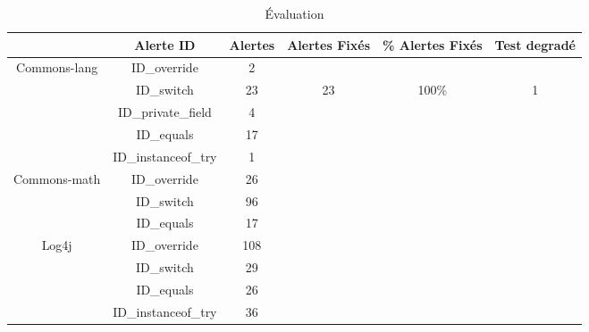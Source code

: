 \documentclass[a4paper]{article}
\begin{document}
\newpage
\begin{center}
	
	\begin{table}[]
\centering
\caption{Évaluation}
\label{my-label}
\begin{tabular}{c|c|c|c|c|c|}
\cline{2-6}
                                                    & Alerte ID           & Alertes & Alertes Fixés & \% Alertes Fixés & Test degradé \\ \hline
\multicolumn{1}{|c|}{\multirow{5}{*}{Commons-lang}} & ID\_override        & 2       &               &                  &              \\ \cline{2-6} 
\multicolumn{1}{|c|}{}                              & ID\_switch          & 23      & 23            & 100\%            & 1            \\ \cline{2-6} 
\multicolumn{1}{|c|}{}                              & ID\_private\_field  & 4       &               &                  &              \\ \cline{2-6} 
\multicolumn{1}{|c|}{}                              & ID\_equals          & 17      &               &                  &              \\ \cline{2-6} 
\multicolumn{1}{|c|}{}                              & ID\_instanceof\_try & 1       &               &                  &              \\ \hline
\multicolumn{1}{|c|}{\multirow{3}{*}{Commons-math}} & ID\_override        & 26      &               &                  &              \\ \cline{2-6} 
\multicolumn{1}{|c|}{}                              & ID\_switch          & 96      &               &                  &              \\ \cline{2-6} 
\multicolumn{1}{|c|}{}                              & ID\_equals          & 17      &               &                  &              \\ \hline
\multicolumn{1}{|c|}{\multirow{4}{*}{Log4j}}        & ID\_override        & 108     &               &                  &              \\ \cline{2-6} 
\multicolumn{1}{|c|}{}                              & ID\_switch          & 29      &               &                  &              \\ \cline{2-6} 
\multicolumn{1}{|c|}{}                              & ID\_equals          & 26      &               &                  &              \\ \cline{2-6} 
\multicolumn{1}{|c|}{}                              & ID\_instanceof\_try & 36      &               &                  &              \\ \hline
\end{tabular}
\end{table}
	
	
  
\end{center} 
\end{document}
